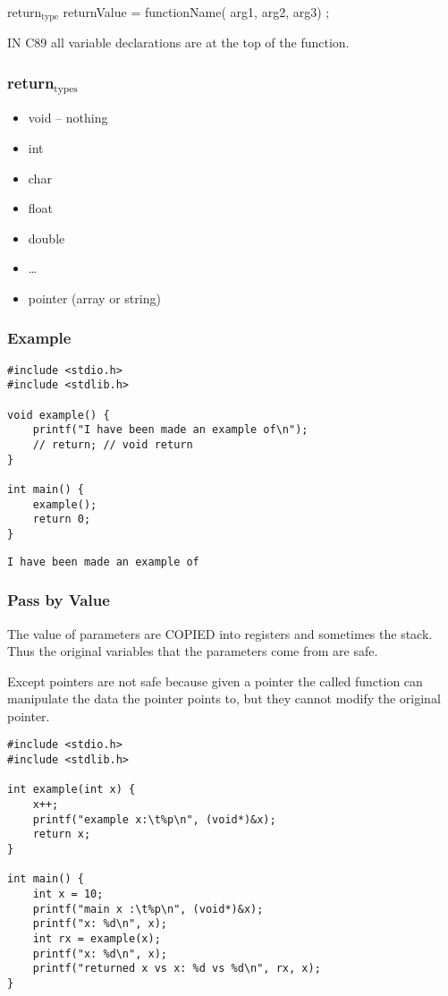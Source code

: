 \documentclass[11pt]{article}
\begin{document}
return\(_{\text{type}}\) returnValue = functionName( arg1, arg2, arg3) ;

IN C89 all variable declarations are at the top of the function.

\subsubsection{return\(_{\text{types}}\)}
\label{sec:org576aa6d}

\begin{itemize}
\item void -- nothing
\item int
\item char
\item float
\item double
\item \ldots{}
\item pointer (array or string)
\end{itemize}

\subsubsection{Example}
\label{sec:org8f54b94}

\begin{verbatim}
#include <stdio.h>
#include <stdlib.h>

void example() {
    printf("I have been made an example of\n");
    // return; // void return
}

int main() {
    example();
    return 0;
}
\end{verbatim}

\begin{verbatim}
I have been made an example of
\end{verbatim}


\subsubsection{Pass by Value}
\label{sec:org1c2102f}

The value of parameters are COPIED into registers and sometimes the
stack. Thus the original variables that the parameters come from are
safe.

Except pointers are not safe because given a pointer the called
function can manipulate the data the pointer points to, but they
cannot modify the original pointer.

\begin{verbatim}
#include <stdio.h>
#include <stdlib.h>

int example(int x) {
    x++;
    printf("example x:\t%p\n", (void*)&x);
    return x;
}

int main() {
    int x = 10;
    printf("main x :\t%p\n", (void*)&x);
    printf("x: %d\n", x);
    int rx = example(x);
    printf("x: %d\n", x);
    printf("returned x vs x: %d vs %d\n", rx, x);
}
\end{verbatim}
\end{document}
